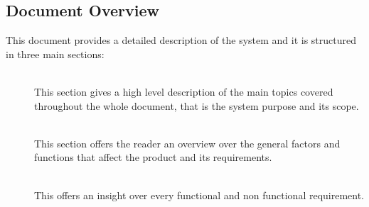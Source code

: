 
\subsection{Document Overview}
This document provides a detailed description of the system and it is structured in three main sections:

\begin{description}
  \item[] \hfill \\
  This section gives a high level description of the main topics covered throughout the whole document, that is the system purpose and its scope.
  \item[] \hfill \\
  This section offers the reader an overview over the general factors and functions that affect the product and its requirements.
  \item[] \hfill \\
  This offers an insight over every functional and non functional requirement.
\end{description}